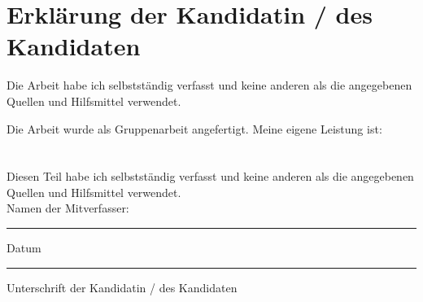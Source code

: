 \chapter{Erklärung der Kandidatin / des Kandidaten}

\begin{description}[$\Box$~]
    \item[$\Box$] Die Arbeit habe ich selbstständig verfasst und keine anderen als die angegebenen Quellen und Hilfsmittel verwendet.\\

    \item[$\Box$] Die Arbeit wurde als Gruppenarbeit angefertigt. Meine eigene Leistung ist:\\
          \\
          \\

          Diesen Teil habe ich selbstständig verfasst und keine anderen als die angegebenen Quellen und Hilfsmittel verwendet. \\

          Namen der Mitverfasser:

\end{description}

\vspace{2cm}

\begin{minipage}[t]{3cm}
    \rule{3cm}{0.5pt}
    Datum
\end{minipage}
\hfill
\begin{minipage}[t]{9cm}
    \rule{9cm}{0.5pt}
    Unterschrift der Kandidatin / des Kandidaten
\end{minipage}